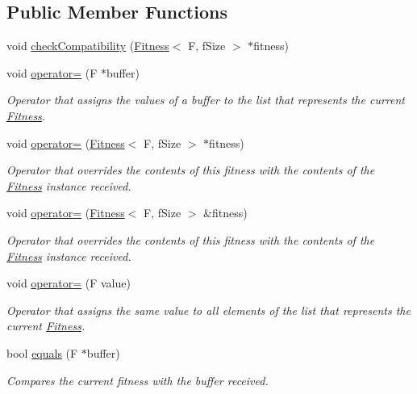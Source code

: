 \subsection*{Public Member Functions}
\begin{DoxyCompactItemize}
\item 
void \hyperlink{structFitness_a73ef98fc5780e1e15bbfac6177bd5c5a}{check\+Compatibility} (\hyperlink{structFitness}{Fitness}$<$ F, f\+Size $>$ $\ast$fitness)
\item 
void \hyperlink{structFitness_a557b47961eb4a4589c53ee54f975e65e}{operator=} (F $\ast$buffer)
\begin{DoxyCompactList}\small\item\em Operator that assigns the values of a buffer to the list that represents the current \hyperlink{structFitness}{Fitness}. \end{DoxyCompactList}\item 
void \hyperlink{structFitness_a19e4c2cc608e17611deacc194d83dc89}{operator=} (\hyperlink{structFitness}{Fitness}$<$ F, f\+Size $>$ $\ast$fitness)
\begin{DoxyCompactList}\small\item\em Operator that overrides the contents of this fitness with the contents of the \hyperlink{structFitness}{Fitness} instance received. \end{DoxyCompactList}\item 
void \hyperlink{structFitness_afd45c5c802ca9d0086685e85730f13da}{operator=} (\hyperlink{structFitness}{Fitness}$<$ F, f\+Size $>$ \&fitness)
\begin{DoxyCompactList}\small\item\em Operator that overrides the contents of this fitness with the contents of the \hyperlink{structFitness}{Fitness} instance received. \end{DoxyCompactList}\item 
void \hyperlink{structFitness_a875d901a35662cf786bcc17b9e1a6983}{operator=} (F value)
\begin{DoxyCompactList}\small\item\em Operator that assigns the same value to all elements of the list that represents the current \hyperlink{structFitness}{Fitness}. \end{DoxyCompactList}\item 
bool \hyperlink{structFitness_abd044181ac7240fa59c7a25fbcca5150}{equals} (F $\ast$buffer)
\begin{DoxyCompactList}\small\item\em Compares the current fitness with the buffer received. \end{DoxyCompactList}\item 

\end{DoxyCompactItemize}
